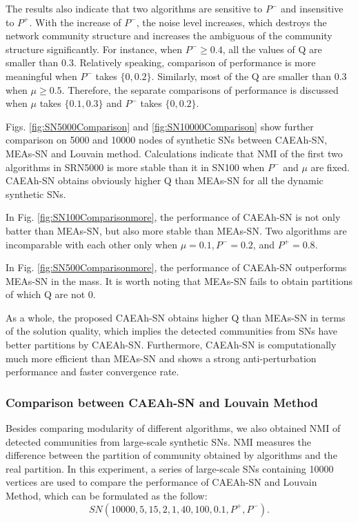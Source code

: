 \documentclass[10pt, journal]{IEEEtran}
\begin{document}
The results also indicate that two algorithms are sensitive to $P^-$ and insensitive to $P^+$. With the increase of $P^-$, the noise level increases, which destroys the network community structure and increases the ambiguous of the community structure significantly. For instance, when $P^- \geq 0.4$, all the values of Q are smaller than 0.3. Relatively speaking, comparison of performance is more meaningful when $P^-$ takes $\{0,0.2 \}$. Similarly, most of the Q are smaller than 0.3 when $\mu \geq 0.5$. Therefore, the separate comparisons of performance is discussed when $\mu$ takes $\{0.1,0.3\}$ and $P^-$ takes $\{0,0.2\}$.

Figs. \ref{fig:SN5000Comparison} and \ref{fig:SN10000Comparison} show further comparison on 5000 and 10000 nodes of synthetic SNs  between CAEAh-SN, MEAs-SN and Louvain method. Calculations indicate that NMI of the first two algorithms in SRN5000 is more stable than it in SN100 when $P^-$ and $\mu$ are fixed. CAEAh-SN obtains obviously higher Q than MEAs-SN for all the dynamic synthetic SNs.

In Fig. \ref{fig:SN100Comparisonmore}, the performance of CAEAh-SN is not only batter than MEAs-SN, but also more stable than MEAs-SN. Two algorithms are incomparable with each other only when $\mu=0.1, P^-=0.2$, and $P^+=0.8$.


In Fig. \ref{fig:SN500Comparisonmore}, the performance of CAEAh-SN outperforms MEAs-SN in the mass. It is worth noting that MEAs-SN fails to obtain partitions of which Q are not 0.

As a whole, the proposed CAEAh-SN obtains higher Q than MEAs-SN in terms of the solution quality, which implies the detected communities from SNs have better partitions by CAEAh-SN. Furthermore, CAEAh-SN is computationally much more efficient than MEAs-SN and shows a strong anti-perturbation performance and faster convergence rate.

\subsubsection{Comparison between CAEAh-SN and Louvain Method}
Besides comparing modularity of different algorithms, we also obtained NMI of detected communities from large-scale synthetic SNs. NMI measures the difference between the partition of community obtained by algorithms and the real partition. In this experiment, a series of large-scale SNs containing 10000 vertices are used to compare the performance of CAEAh-SN and Louvain Method, which can be formulated as the follow:
\begin{equation} \label{equ:large SNs}
SN(10000,5,15,2,1,40,100,0.1,P^+,P^-).
\end{equation}
\end{document}
